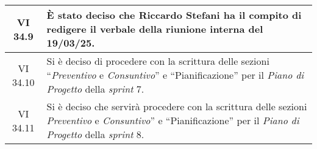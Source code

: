\begin{table}[htbp]
\begin{tabular}{|c|p{}|}
        \hline
        VI 34.9 & È stato deciso che Riccardo Stefani ha il compito di redigere il verbale della riunione interna del 19/03/25.\\
        \hline
        VI 34.10 & Si è deciso di procedere con la scrittura delle sezioni “\emph{Preventivo} e \emph{Consuntivo}” e “Pianificazione” per il \emph{Piano di Progetto} della \emph{sprint} 7.\\
        \hline
        VI 34.11 & Si è deciso che servirà procedere con la scrittura delle sezioni \emph{Preventivo} e \emph{Consuntivo}” e “Pianificazione” per il \emph{Piano di Progetto} della \emph{sprint} 8.\\
        \hline
    \end{tabular}
\end{table}


